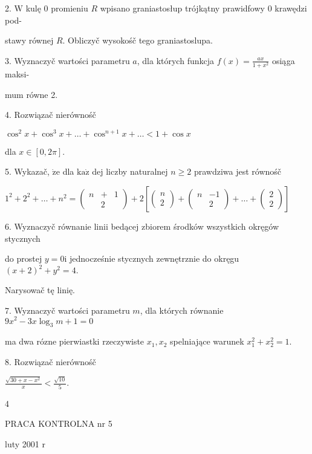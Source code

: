 \documentclass[a4paper,12pt]{article}
\begin{document}
2. $\mathrm{W}$ kulę $0$ promieniu $R$ wpisano graniastosłup trójkątny prawidfowy $0$ krawędzi pod-

stawy równej $R$. Obliczyč wysokośč tego graniastoslupa.

3. Wyznaczyč wartości parametru $a$, dla których funkcja $f(x) = \displaystyle \frac{ax}{1+x^{2}}$ osiąga maksi-

mum równe 2.

4. Rozwiązač nierównośč

$\cos^{2}x+\cos^{3}x+\ldots+\cos^{n+1}x+\ldots<1+\cos x$

dla $x\in[0,2\pi].$

5. Wykazač, $\dot{\mathrm{z}}\mathrm{e}$ dla $\mathrm{k}\mathrm{a}\dot{\mathrm{z}}$ dej liczby naturalnej $n\geq 2$ prawdziwa jest równośč

$1^{2}+2^{2}+\ldots+n^{2}= \left(\begin{array}{lll}
n & + & 1\\
 & 2 & 
\end{array}\right)+2[\left(\begin{array}{l}
n\\
2
\end{array}\right)+\left(\begin{array}{ll}
n & -1\\
 & 2
\end{array}\right)+\ldots+ \left(\begin{array}{l}
2\\
2
\end{array}\right)]$

6. Wyznaczyč równanie linii bedącej zbiorem środków wszystkich okręgów stycznych

do prostej $y=0\mathrm{i}$ jednocześnie stycznych zewnętrznie do okręgu $(x+2)^{2}+y^{2}=4.$

Narysowač tę linię.

7. Wyznaczyč wartości parametru $m$, dla których równanie $9x^{2}-3x\log_{3}m+1 =0$

ma dwa rózne pierwiastki rzeczywiste $x_{1}, x_{2}$ spelniające warunek $x_{1}^{2}+x_{2}^{2}=1.$

8. Rozwiązač nierównośč

$\displaystyle \frac{\sqrt{30+x-x^{2}}}{x}<\frac{\sqrt{10}}{5}.$

4





PRACA KONTROLNA nr 5

luty 2001 $\mathrm{r}$
\end{document}
